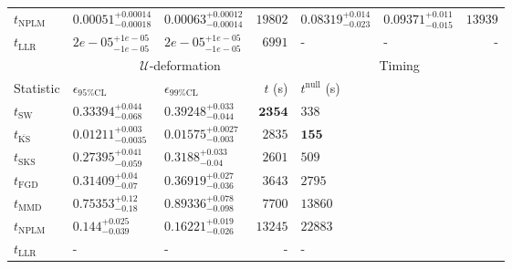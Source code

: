 \begin{tabular}{l|llr|llr}
\rowcolor{red!35}	$t_{\mathrm{NPLM}}$ & $0.00051_{-0.00018}^{+0.00014}$ & $0.00063_{-0.00014}^{+0.00012}$ & $19802$ & $0.08319_{-0.023}^{+0.014}$ & $0.09371_{-0.015}^{+0.011}$ & $13939$ \\
	$t_{\mathrm{LLR}}$ & $2e-05_{-1e-05}^{+1e-05}$ & $2e-05_{-1e-05}^{+1e-05}$ & $6991$ & - & - & - \\
	\toprule
	\multicolumn{1}{c}{} & \multicolumn{3}{c}{$\mathcal{U}$-deformation} & \multicolumn{3}{c}{Timing} \\
	Statistic & $\epsilon_{95\%\mathrm{CL}}$ & $\epsilon_{99\%\mathrm{CL}}$ & $t$ (s) & $t^{\mathrm{null}}$ (s) \\
	\midrule
	$t_{\mathrm{SW}}$ & $0.33394_{-0.068}^{+0.044}$ & $0.39248_{-0.044}^{+0.033}$ & ${\mathbf{2354}}$ & $338$ \\
	$t_{\overline{\mathrm{KS}}}$ & ${\mathbf{0.01211_{-0.0035}^{+0.003}}}$ & ${\mathbf{0.01575_{-0.003}^{+0.0027}}}$ & $2835$ & ${\mathbf{155}}$ \\
	$t_{\mathrm{SKS}}$ & $0.27395_{-0.059}^{+0.041}$ & $0.3188_{-0.04}^{+0.033}$ & $2601$ & $509$ \\
	$t_{\mathrm{FGD}}$ & $0.31409_{-0.07}^{+0.04}$ & $0.36919_{-0.036}^{+0.027}$ & $3643$ & $2795$ \\
	$t_{\mathrm{MMD}}$ & $0.75353_{-0.18}^{+0.12}$ & $0.89336_{-0.098}^{+0.078}$ & $7700$ & $13860$ \\
\rowcolor{red!35}	$t_{\mathrm{NPLM}}$ & $0.144_{-0.039}^{+0.025}$ & $0.16221_{-0.026}^{+0.019}$ & $13245$ & $22883$ \\
	$t_{\mathrm{LLR}}$ & - & - & - & - \\
	\bottomrule
\end{tabular}